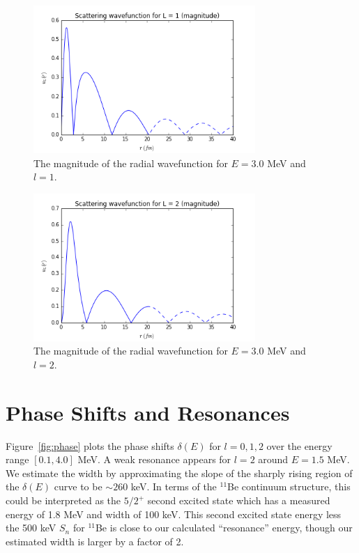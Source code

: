 \documentclass[]{scrartcl}
\begin{document}
\begin{figure}
\centering
	\includegraphics[width=0.75\textwidth]{figures/E30/magnitude1.png}
	\caption{The magnitude of the radial wavefunction for $E = 3.0$ MeV and $l=1$.}
	\label{fig:e01l1}
\end{figure}

\begin{figure}[h]
\centering
	\includegraphics[width=0.75\textwidth]{figures/E30/magnitude2.png}
	\caption{The magnitude of the radial wavefunction for $E = 3.0$ MeV and $l=2$.}
	\label{fig:e01l2}
\end{figure}


\section*{Phase Shifts and Resonances}

Figure~\ref{fig:phase} plots the phase shifts $\delta(E)$ for $l=0,1,2$ over the energy range $[0.1,4.0]$ MeV. A weak resonance appears for $l=2$ around $E=1.5$ MeV. We estimate the width by approximating the slope of the sharply rising region of the $\delta (E)$ curve to be $\sim 260$ keV. In terms of the $^{11}$Be continuum structure, this could be interpreted as the $5/2 ^+$ second excited state which has a measured energy of 1.8 MeV and width of 100 keV. This second excited state energy less the 500 keV $S _n $ for $^{11}$Be is close to our calculated ``resonance'' energy, though our estimated width is larger by a factor of 2.
\end{document}
